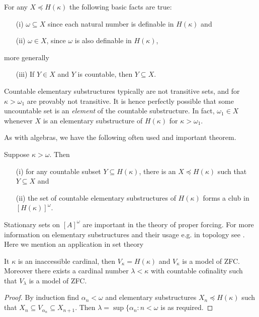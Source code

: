 \begin{fact}\label{elementary-fact}
For any $X\preceq H(\kappa)$ the following basic facts are true:
\begin{itemize}
  \item[(i)] $\omega\subseteq X$ since each natural number is definable in $H(\kappa)$ and
  \item[(ii)] $\omega\in X$, since $\omega$ is also definable in $H(\kappa)$,
\end{itemize}
more generally
\begin{itemize}
  \item[(iii)] If $Y\in X$ and $Y$ is countable, then $Y\subseteq X$.
\end{itemize}
\end{fact}

\begin{note}
Countable elementary substructures typically are not transitive sets, and for $\kappa>\omega_1$ are provably not transitive.
             It is hence perfectly possible that some uncountable set is an \emph{element} of the countable substructure. In fact,
             $\omega_1\in X$ whenever $X$ is an elementary substructure of $H(\kappa)$ for $\kappa>\omega_1$.
\end{note}

As with algebras, we have the following often used and important theorem.

\begin{theorem} Suppose $\kappa>\omega$. Then
\begin{itemize}
  \item[(i)] for any countable subset $Y\subseteq H(\kappa)$, there is an
	$X\preceq H(\kappa)$ such that $Y\subseteq X$ and
  \item[(ii)] the set of countable elementary substructures of $H(\kappa)$
	forms a club in $[H(\kappa)]^\omega$.
\end{itemize}
\end{theorem}

Stationary sets on $[A]^\omega$ are important in the theory of proper forcing. For more information on elementary substructures
and their usage e.g. in topology see \cite{DowST}. Here we mention an application in set theory

\begin{theorem} It $\kappa$ is an inaccessible cardinal, then $V_\kappa = H(\kappa)$ and
 $V_\kappa$ is a model of ZFC. Moreover there exists a cardinal number $\lambda<\kappa$
 with countable cofinality such that $V_\lambda$ is a model of ZFC.
\end{theorem}
\begin{proof} By induction find $\alpha_n<\omega$ and elementary substructures $X_n\preceq H(\kappa)$
such that $X_n\subseteq V_{\alpha_n}\subseteq X_{n+1}$. Then $\lambda=\sup\{\alpha_n:n<\omega$ is as required.
\end{proof}



